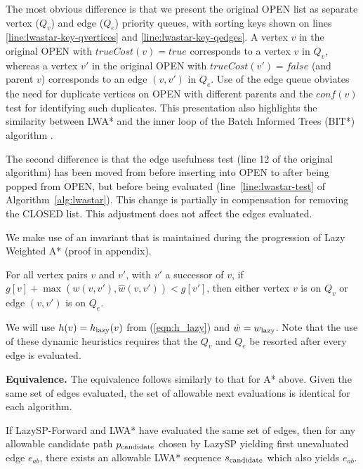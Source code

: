 The most obvious difference is that we present the original OPEN list
as separate vertex ($Q_v$) and edge ($Q_e$) priority queues,
with sorting keys shown on lines \ref{line:lwastar-key-qvertices}
and \ref{line:lwastar-key-qedges}.
A vertex $v$ in the original OPEN with $trueCost(v) = true$
corresponds to a vertex $v$ in $Q_v$,
whereas a vertex $v'$ in the original OPEN
with $trueCost(v') = false$ (and parent $v$)
corresponds to an edge $(v,v')$ in $Q_e$.
Use of the edge queue obviates the need for
duplicate vertices on OPEN with different parents
and the $conf(v)$ test for identifying such duplicates.
This presentation also highlights the similarity between LWA*
and the inner loop of the Batch Informed Trees (BIT*) algorithm
\citep{gammell2015bitstar}.

The second difference is that the edge usefulness test
(line 12 of the original algorithm)
has been moved from before inserting into OPEN
to after being popped from OPEN,
but before being evaluated
(line~\ref{line:lwastar-test} of Algorithm~\ref{alg:lwastar}).
This change is partially in compensation for removing the CLOSED
list.
This adjustment
does not affect the edges evaluated.

We make use of an invariant that is maintained during the
progression of Lazy Weighted A* (proof in appendix).
\begin{invariant}
For all vertex pairs $v$ and $v'$,
with $v'$ a successor of $v$,
if $g[v] + \max(w(v,v'), \hat{w}(v,v')) < g[v']$,
then either vertex $v$ is on $Q_{v}$
or edge $(v,v')$ is on $Q_e$.%
\label{inv:lwastar}%
\end{invariant}
We will use $h(v) = h_{\mbox{\scriptsize lazy}}(v)$ from (\ref{eqn:h_lazy})
and $\hat{w} = w_{\mbox{\scriptsize lazy}}$.
Note that the use of these dynamic heuristics requires that the
$Q_v$ and $Q_e$ be resorted after every edge is evaluated.

\textbf{Equivalence.}
The equivalence follows similarly to that for A* above.
Given the same set of edges evaluated,
the set of allowable next evaluations is identical for each
algorithm.

\begin{theorem}
If LazySP-Forward and LWA* have evaluated the same set of edges,
then for any allowable candidate path $p_{\mbox{\scriptsize candidate}}$
chosen by LazySP yielding first unevaluated edge $e_{ab}$,
there exists an allowable LWA* sequence $s_{\mbox{\scriptsize candidate}}$
which also yields $e_{ab}$.
\label{thm:lwastar-equiv-from-lazy}
\end{theorem}

